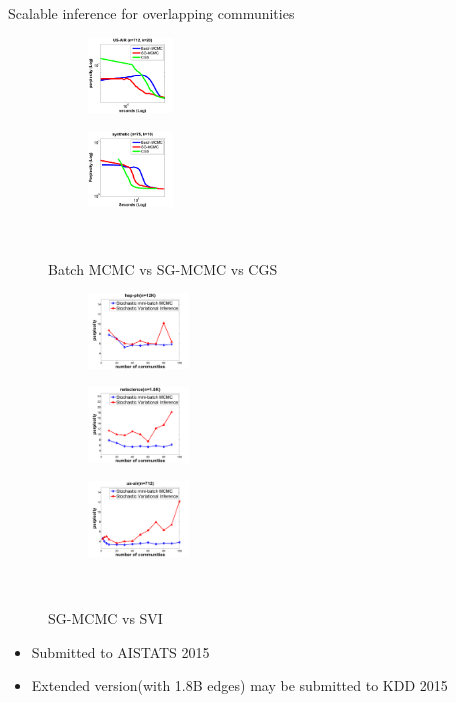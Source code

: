 \documentclass[mathserif, handout]{beamer}
\begin{document}
\begin{frame}{Scalable inference for overlapping communities}
\begin{figure}
  \begin{subfigure}[b]{.2\linewidth}
    \includegraphics[height=2cm]{1st_usair.png}
  \end{subfigure}
  \begin{subfigure}[b]{.2\linewidth}
    \includegraphics[height=2cm]{compare_1.png}
  \end{subfigure}\\
\caption{Batch MCMC vs SG-MCMC vs CGS}\label{fig:1}
\end{figure}


\begin{figure}
  \begin{subfigure}[b]{.2\linewidth}
    \includegraphics[height=2cm]{3rd_hepph}
  \end{subfigure}
  \begin{subfigure}[b]{.2\linewidth}
    \includegraphics[height=2cm]{3rd_netscience}
  \end{subfigure}
  \begin{subfigure}[b]{.2\linewidth}
    \includegraphics[height=2cm]{3rd_usair}
  \end{subfigure}\\
\caption{SG-MCMC vs SVI}\label{fig:1}
\end{figure}

\begin{itemize}
\item Submitted to AISTATS 2015
\item Extended version(with 1.8B edges) may be submitted to KDD 2015
\end{itemize}
\end{frame}
\end{document}
